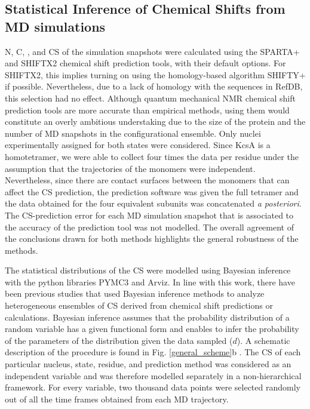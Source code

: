 \documentclass[%
 aip,
 amsmath,amssymb,
 preprint,%
]{revtex4-1}
\newcommand{\ca}{\ce{C_\alpha} }
\newcommand{\cb}{\ce{C_\beta} }
\begin{document}
\subsection{Statistical Inference of Chemical Shifts from MD simulations}

N, C, \ca, and \cb CS of the simulation snapshots were calculated using the SPARTA+\cite{Shen2010} and SHIFTX2\cite{Han2011} chemical shift prediction tools, with their default options. For SHIFTX2, this implies turning on using the homology-based algorithm SHIFTY+ if possible. Nevertheless, due to a lack of homology with the sequences in RefDB\cite{Zhang2003}, this selection had no effect. Although quantum mechanical NMR chemical shift prediction tools are more accurate than empirical methods, using them would constitute an overly ambitious understaking due to the size of the protein and the number of MD snapshots in the configurational ensemble. Only nuclei experimentally assigned for both states were considered. Since KcsA is a homotetramer, we were able to collect four times the data per residue under the assumption that the trajectories of the monomers were independent. Nevertheless, since there are contact surfaces between the monomers that can affect the CS prediction, the prediction software was given the full tetramer and the data obtained for the four equivalent subunits was concatenated \textit{a posteriori}. The CS-prediction error for each MD simulation snapshot that is associated to the accuracy of the prediction tool was not modelled. The overall agreement of the conclusions drawn for both methods highlights the general robustness of the methods. 

The statistical distributions of the CS were modelled using Bayesian inference with the python libraries PYMC3\cite{Salvatier2016} and Arviz\cite{arviz_2019}. In line with this work, there have been previous studies that used Bayesian inference methods to analyze heterogeneous ensembles of CS derived from chemical shift predictions or calculations.\cite{Bonomi2016,Bratholm2017,Bratholm2015} Bayesian inference assumes that the probability distribution of a random variable has a given functional form and enables to infer the probability of the parameters of the distribution given the data sampled ($d$). A schematic description of the procedure is found in Fig. \ref{general_scheme}b . The CS of each particular nucleus, state, residue, and prediction method was considered as an independent variable and was therefore modelled separately in a non-hierarchical framework. For every variable, two thousand data points were selected randomly out of all the time frames obtained from each MD trajectory. 
\end{document}
